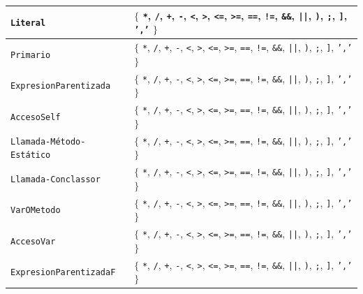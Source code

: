 \begin{longtable}{|
>{\raggedright\arraybackslash}p{}|
>{\raggedright\arraybackslash}p{}|}
\texttt{Literal} & \(\{\) \texttt{*}, \texttt{/}, \texttt{+}, \texttt{-}, \texttt{<}, \texttt{>}, \texttt{<=}, \texttt{>=}, \texttt{==}, \texttt{!=}, \texttt{\&\&}, \texttt{||}, \texttt{)}, \texttt{;}, \texttt{]}, \texttt{','} \(\}\) \\ \hline
\texttt{Primario} & \(\{\) \texttt{*}, \texttt{/}, \texttt{+}, \texttt{-}, \texttt{<}, \texttt{>}, \texttt{<=}, \texttt{>=}, \texttt{==}, \texttt{!=}, \texttt{\&\&}, \texttt{||}, \texttt{)}, \texttt{;}, \texttt{]}, \texttt{','} \(\}\) \\ \hline
\texttt{ExpresionParentizada} & \(\{\) \texttt{*}, \texttt{/}, \texttt{+}, \texttt{-}, \texttt{<}, \texttt{>}, \texttt{<=}, \texttt{>=}, \texttt{==}, \texttt{!=}, \texttt{\&\&}, \texttt{||}, \texttt{)}, \texttt{;}, \texttt{]}, \texttt{','} \(\}\) \\ \hline
\texttt{AccesoSelf} & \(\{\) \texttt{*}, \texttt{/}, \texttt{+}, \texttt{-}, \texttt{<}, \texttt{>}, \texttt{<=}, \texttt{>=}, \texttt{==}, \texttt{!=}, \texttt{\&\&}, \texttt{||}, \texttt{)}, \texttt{;}, \texttt{]}, \texttt{','} \(\}\) \\ \hline
\texttt{Llamada-Método-Estático} & \(\{\) \texttt{*}, \texttt{/}, \texttt{+}, \texttt{-}, \texttt{<}, \texttt{>}, \texttt{<=}, \texttt{>=}, \texttt{==}, \texttt{!=}, \texttt{\&\&}, \texttt{||}, \texttt{)}, \texttt{;}, \texttt{]}, \texttt{','} \(\}\) \\ \hline
\texttt{Llamada-Conclassor} & \(\{\) \texttt{*}, \texttt{/}, \texttt{+}, \texttt{-}, \texttt{<}, \texttt{>}, \texttt{<=}, \texttt{>=}, \texttt{==}, \texttt{!=}, \texttt{\&\&}, \texttt{||}, \texttt{)}, \texttt{;}, \texttt{]}, \texttt{','} \(\}\) \\ \hline
\texttt{VarOMetodo} & \(\{\) \texttt{*}, \texttt{/}, \texttt{+}, \texttt{-}, \texttt{<}, \texttt{>}, \texttt{<=}, \texttt{>=}, \texttt{==}, \texttt{!=}, \texttt{\&\&}, \texttt{||}, \texttt{)}, \texttt{;}, \texttt{]}, \texttt{','} \(\}\) \\ \hline
\texttt{AccesoVar} & \(\{\) \texttt{*}, \texttt{/}, \texttt{+}, \texttt{-}, \texttt{<}, \texttt{>}, \texttt{<=}, \texttt{>=}, \texttt{==}, \texttt{!=}, \texttt{\&\&}, \texttt{||}, \texttt{)}, \texttt{;}, \texttt{]}, \texttt{','} \(\}\) \\ \hline
\texttt{ExpresionParentizadaF} & \(\{\) \texttt{*}, \texttt{/}, \texttt{+}, \texttt{-}, \texttt{<}, \texttt{>}, \texttt{<=}, \texttt{>=}, \texttt{==}, \texttt{!=}, \texttt{\&\&}, \texttt{||}, \texttt{)}, \texttt{;}, \texttt{]}, \texttt{','} \(\}\) \\ \hline

\end{longtable}
